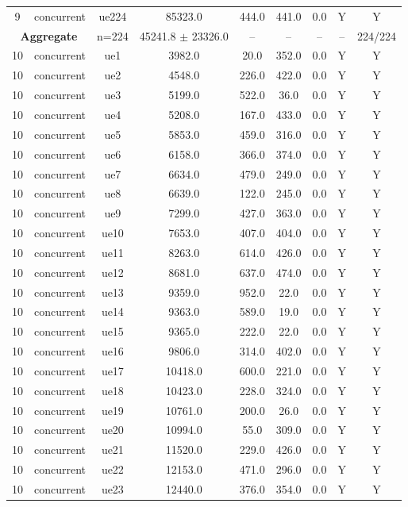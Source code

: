 \begin{table}[ht]
\begin{tabular}{|c|c|c|c|c|c|c|c|c|}
9 & concurrent & ue224 & 85323.0 & 444.0 & 441.0 & 0.0 & Y & Y \\
\multicolumn{2}{|c|}{\textbf{Aggregate}} & n=224 & 45241.8 $\pm$ 23326.0 & -- & -- & -- & -- & 224/224 \\
\hline
10 & concurrent & ue1 & 3982.0 & 20.0 & 352.0 & 0.0 & Y & Y \\
10 & concurrent & ue2 & 4548.0 & 226.0 & 422.0 & 0.0 & Y & Y \\
10 & concurrent & ue3 & 5199.0 & 522.0 & 36.0 & 0.0 & Y & Y \\
10 & concurrent & ue4 & 5208.0 & 167.0 & 433.0 & 0.0 & Y & Y \\
10 & concurrent & ue5 & 5853.0 & 459.0 & 316.0 & 0.0 & Y & Y \\
10 & concurrent & ue6 & 6158.0 & 366.0 & 374.0 & 0.0 & Y & Y \\
10 & concurrent & ue7 & 6634.0 & 479.0 & 249.0 & 0.0 & Y & Y \\
10 & concurrent & ue8 & 6639.0 & 122.0 & 245.0 & 0.0 & Y & Y \\
10 & concurrent & ue9 & 7299.0 & 427.0 & 363.0 & 0.0 & Y & Y \\
10 & concurrent & ue10 & 7653.0 & 407.0 & 404.0 & 0.0 & Y & Y \\
10 & concurrent & ue11 & 8263.0 & 614.0 & 426.0 & 0.0 & Y & Y \\
10 & concurrent & ue12 & 8681.0 & 637.0 & 474.0 & 0.0 & Y & Y \\
10 & concurrent & ue13 & 9359.0 & 952.0 & 22.0 & 0.0 & Y & Y \\
10 & concurrent & ue14 & 9363.0 & 589.0 & 19.0 & 0.0 & Y & Y \\
10 & concurrent & ue15 & 9365.0 & 222.0 & 22.0 & 0.0 & Y & Y \\
10 & concurrent & ue16 & 9806.0 & 314.0 & 402.0 & 0.0 & Y & Y \\
10 & concurrent & ue17 & 10418.0 & 600.0 & 221.0 & 0.0 & Y & Y \\
10 & concurrent & ue18 & 10423.0 & 228.0 & 324.0 & 0.0 & Y & Y \\
10 & concurrent & ue19 & 10761.0 & 200.0 & 26.0 & 0.0 & Y & Y \\
10 & concurrent & ue20 & 10994.0 & 55.0 & 309.0 & 0.0 & Y & Y \\
10 & concurrent & ue21 & 11520.0 & 229.0 & 426.0 & 0.0 & Y & Y \\
10 & concurrent & ue22 & 12153.0 & 471.0 & 296.0 & 0.0 & Y & Y \\
10 & concurrent & ue23 & 12440.0 & 376.0 & 354.0 & 0.0 & Y & Y \\

\end{tabular}
\end{table}
